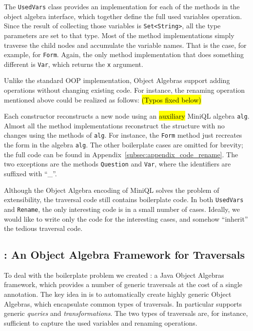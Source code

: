The \lstinline{UsedVars} class provides an implementation for each
of the methods in the object algebra interface, which together define the
full used variables operation. Since the result of collecting those
variables is \lstinline{Set<String>}, all the type parameters are set to
that type. Most of the method implementations simply traverse the
child nodes and accumulate the variable names. That is the case, for
example, for \lstinline{Form}. Again, the only method implementation that does
something different is \lstinline{Var}, which returns the \lstinline{x}
argument.

Unlike the standard OOP implementation,
Object Algebras support adding operations without changing existing code.
For instance, the renaming operation mentioned above could be realized
as follows: \hl{(Typos fixed below)}


Each
constructor reconstructs a new node using an \hl{auxiliary} MiniQL algebra \lstinline{alg}.
Almost all the method implementations reconstruct the structure with
no changes using the methods of \lstinline{alg}. For instance, the \lstinline{Form} method just recreates the form in the algebra \lstinline{alg}. The other boilerplate cases are omitted for brevity; the full code can be found in
  Appendix~\ref{subsec:appendix_code_rename}. The two exceptions are the
methods \lstinline{Question} and \lstinline{Var}, where the identifiers are suffixed with ``\_''.

Although the Object Algebra encoding of MiniQL solves the problem of extensibility, the traversal code still contains boilerplate code.
In both \lstinline{UsedVars} and \lstinline{Rename}, the only interesting code
is in a small number of cases.  Ideally, we would like to write only
the code for the interesting cases, and somehow ``inherit'' the
tedious traversal code.

\subsection{\Name: An Object Algebra Framework for Traversals}

To deal with the boilerplate problem we created \Name: a Java Object
Algebras framework, which provides a number of generic traversals at
the cost of a single annotation. The key idea in \name is to
automatically create highly generic Object Algebras, which encapsulate
common types of traversals. In particular \name supports generic
\emph{queries} and \emph{transformations}. The two types of
traversals are, for instance,  sufficient to capture the used variables and
renaming operations.

